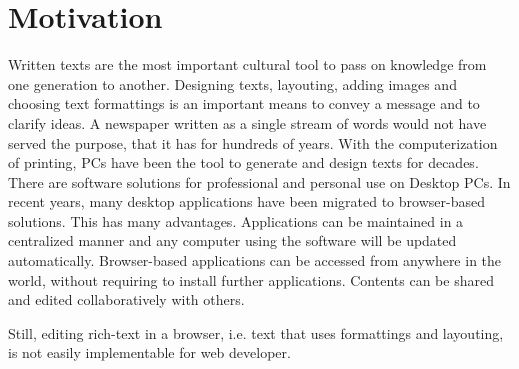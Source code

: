 \section{Motivation}

Written texts are the most important cultural tool to pass on knowledge from one generation to another. Designing texts, layouting, adding images and choosing text formattings is an important means to convey a message and to clarify ideas. A newspaper written as a single stream of words would not have served the purpose, that it has for hundreds of years.
With the computerization of printing, PCs have been the tool to generate and design texts for decades. There are software solutions for professional and personal use on Desktop PCs.
In recent years, many desktop applications have been migrated to browser-based solutions. This has many advantages. Applications can be maintained in a centralized manner and any computer using the software will be updated automatically. Browser-based applications can be accessed from anywhere in the world, without requiring to install further applications. Contents can be shared and edited collaboratively with others.

Still, editing rich-text in a browser, i.e. text that uses formattings and layouting, is not easily implementable for web developer.